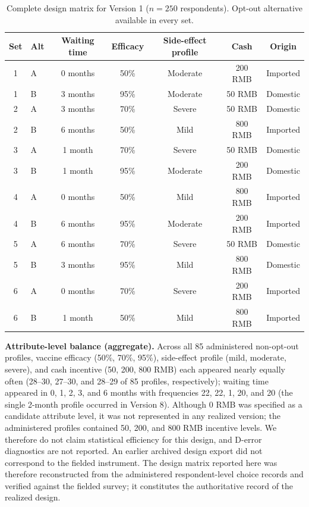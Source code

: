 \begin{table}[H]
\centering
\caption{Complete design matrix for Version 1 ($n=250$ respondents). Opt-out alternative available in every set.}
\label{tab:design_matrix}
\small
\begin{tabular}{clccccc}
\hline
Set & Alt & Waiting time & Efficacy & Side-effect profile & Cash & Origin \\
\hline
1 & A & 0 months & 50\% & Moderate & 200 RMB & Imported \\
1 & B & 3 months & 95\% & Moderate & 50 RMB & Domestic \\
2 & A & 3 months & 70\% & Severe & 50 RMB & Domestic \\
2 & B & 6 months & 50\% & Mild & 800 RMB & Imported \\
3 & A & 1 month & 70\% & Severe & 50 RMB & Domestic \\
3 & B & 1 month & 95\% & Moderate & 200 RMB & Domestic \\
4 & A & 0 months & 50\% & Mild & 800 RMB & Imported \\
4 & B & 6 months & 95\% & Moderate & 200 RMB & Imported \\
5 & A & 6 months & 70\% & Severe & 50 RMB & Domestic \\
5 & B & 3 months & 95\% & Mild & 800 RMB & Domestic \\
6 & A & 0 months & 70\% & Severe & 200 RMB & Imported \\
6 & B & 1 month & 50\% & Mild & 800 RMB & Imported \\
\hline
\end{tabular}
\end{table}

\noindent \textbf{Attribute-level balance (aggregate).} Across all 85 administered non-opt-out profiles, vaccine efficacy (50\%, 70\%, 95\%), side-effect profile (mild, moderate, severe), and cash incentive (50, 200, 800 RMB) each appeared nearly equally often (28--30, 27--30, and 28--29 of 85 profiles, respectively); waiting time appeared in 0, 1, 2, 3, and 6 months with frequencies 22, 22, 1, 20, and 20 (the single 2-month profile occurred in Version 8). Although 0 RMB was specified as a candidate attribute level, it was not represented in any realized version; the administered profiles contained 50, 200, and 800 RMB incentive levels. We therefore do not claim statistical efficiency for this design, and D-error diagnostics are not reported. An earlier archived design export did not correspond to the fielded instrument. The design matrix reported here was therefore reconstructed from the administered respondent-level choice records and verified against the fielded survey; it constitutes the authoritative record of the realized design.

